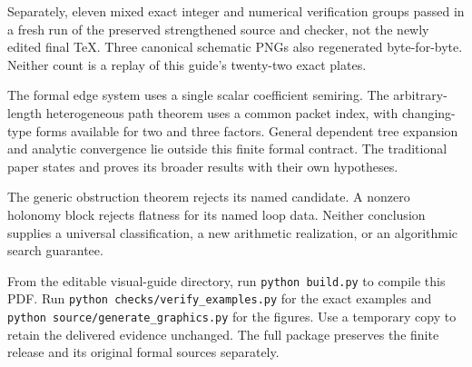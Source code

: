 Separately, eleven mixed exact integer and numerical verification groups passed in a fresh run of the preserved strengthened source and checker, not the newly edited final TeX. Three canonical schematic PNGs also regenerated byte-for-byte. Neither count is a replay of this guide's twenty-two exact plates.

The formal edge system uses a single scalar coefficient semiring. The arbitrary-length heterogeneous path theorem uses a common packet index, with changing-type forms available for two and three factors. General dependent tree expansion and analytic convergence lie outside this finite formal contract. The traditional paper states and proves its broader results with their own hypotheses.

The generic obstruction theorem rejects its named candidate. A nonzero holonomy block rejects flatness for its named loop data. Neither conclusion supplies a universal classification, a new arithmetic realization, or an algorithmic search guarantee.

From the editable visual-guide directory, run \texttt{python build.py} to compile this PDF. Run \texttt{python checks/verify\_examples.py} for the exact examples and \texttt{python source/generate\_graphics.py} for the figures. Use a temporary copy to retain the delivered evidence unchanged. The full package preserves the finite release and its original formal sources separately.

